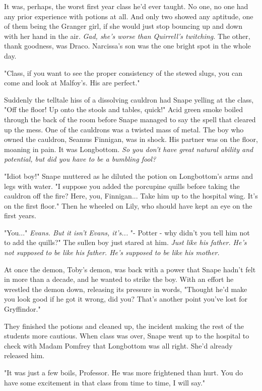 \documentclass[a4paper,11pt]{article}
\begin{document}
It was, perhaps, the worst first year class he'd ever taught. No one, no one had any prior experience with potions at all. And only two showed any aptitude, one of them being the Granger girl, if she would just stop bouncing up and down with her hand in the air. \emph{Gad, she's worse than Quirrell's twitching.} The other, thank goodness, was Draco. Narcissa's son was the one bright spot in the whole day.

"Class, if you want to see the proper consistency of the stewed slugs, you can come and look at Malfoy's. His are perfect."

Suddenly the telltale hiss of a dissolving cauldron had Snape yelling at the class, "Off the floor! Up onto the stools and tables, quick!" Acid green smoke boiled through the back of the room before Snape managed to say the spell that cleared up the mess. One of the cauldrons was a twisted mass of metal. The boy who owned the cauldron, Seamus Finnigan, was in shock. His partner was on the floor, moaning in pain. It was Longbottom. \emph{So you don't have great natural ability and potential, but did you have to be a bumbling fool?}

"Idiot boy!" Snape muttered as he diluted the potion on Longbottom's arms and legs with water. "I suppose you added the porcupine quills before taking the cauldron off the fire? Here, you, Finnigan... Take him up to the hospital wing. It's on the first floor." Then he wheeled on Lily, who should have kept an eye on the first years.

"You..." \emph{Evans. But it isn't Evans, it's...} "- Potter - why didn't you tell him not to add the quills?" The sullen boy just stared at him. \emph{Just like his father. He's not supposed to be like his father. He's supposed to be like his mother.}

At once the demon, Toby's demon, was back with a power that Snape hadn't felt in more than a decade, and he wanted to strike the boy. With an effort he wrestled the demon down, releasing its pressure in words, "Thought he'd make you look good if he got it wrong, did you? That's another point you've lost for Gryffindor."

They finished the potions and cleaned up, the incident making the rest of the students more cautious. When class was over, Snape went up to the hospital to check with Madam Pomfrey that Longbottom was all right. She'd already released him.

"It was just a few boils, Professor. He was more frightened than hurt. You do have some excitement in that class from time to time, I will say."
\end{document}
